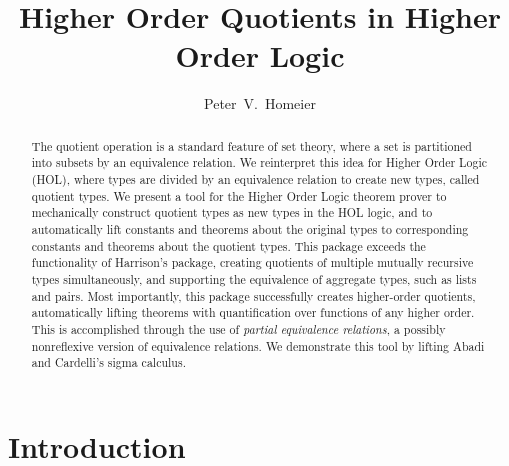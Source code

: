 \documentclass[envcountsame,runningheads]{llncs}
\newcommand{\quotient}{partial equivalence}
\begin{document}
\title{Higher Order Quotients in Higher Order Logic}


\author{Peter~V.~Homeier}



\maketitle

\begin{abstract}
The quotient operation is a standard feature of set theory, where
a set is partitioned into subsets by an equivalence relation.
We reinterpret this idea for Higher Order Logic (HOL), where types are
divided by an equivalence relation to create new types, called
quotient types.
We present a tool for the Higher Order Logic theorem prover
to mechanically construct quotient types as
new types in the HOL logic,
and to automatically lift constants and
theorems about the original types
to corresponding constants and theorems about the quotient types.
This package exceeds the functionality of Harrison's package,
creating quotients of multiple mutually recursive types simultaneously,
and supporting the equivalence of aggregate types, such as lists and pairs.
Most importantly,
this package successfully
creates higher-order quotients, automatically lifting
theorems with quantification over functions
of any higher order.
This is accomplished through the
use
of {\it \quotient{} relations},
a possibly nonreflexive version of equivalence relations.
We demonstrate this tool by lifting Abadi and Cardelli's sigma calculus.
\end{abstract}


%
\section{Introduction}
%
\end{document}
